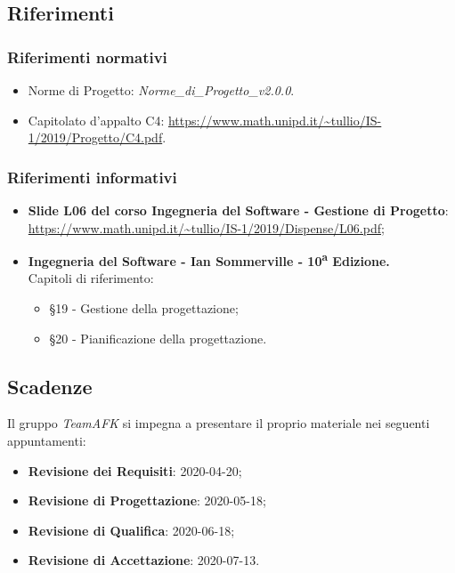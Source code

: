 \subsection{Riferimenti}
\subsubsection{Riferimenti normativi}
\begin{itemize}
	\item Norme di Progetto: \textit{Norme\_di\_Progetto\_v2.0.0}.
	\item Capitolato d'appalto C4: \url{https://www.math.unipd.it/~tullio/IS-1/2019/Progetto/C4.pdf}.
\end{itemize}
\subsubsection{Riferimenti informativi}
\begin{itemize}
	\item \textbf{Slide L06 del corso Ingegneria del Software - Gestione di Progetto}: \\
	\url{https://www.math.unipd.it/~tullio/IS-1/2019/Dispense/L06.pdf};
	\item \textbf{Ingegneria del Software - Ian Sommerville - 10\textsuperscript{a} Edizione.}\\
	Capitoli di riferimento: \begin{itemize}
	\item \S 19 - Gestione della progettazione;
	\item \S 20 - Pianificazione della progettazione.
	\end{itemize}
\end{itemize}
\subsection{Scadenze}
Il gruppo \textit{TeamAFK} si impegna a presentare il proprio materiale nei seguenti appuntamenti:\\
\begin{itemize}
\item \textbf{Revisione dei Requisiti}: 2020-04-20;
\item \textbf{Revisione di Progettazione}: 2020-05-18;
\item \textbf{Revisione di Qualifica}: 2020-06-18;
\item \textbf{Revisione di Accettazione}: 2020-07-13. 
\end{itemize}
